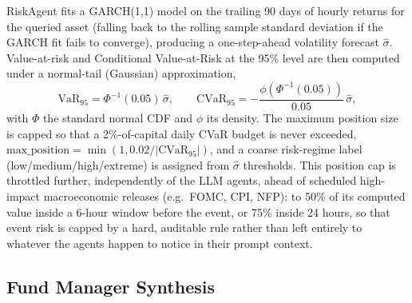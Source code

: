 RiskAgent fits a GARCH(1,1) model \cite{bollerslev1986} on the trailing 90 days of hourly returns for the queried asset (falling back to the rolling sample standard deviation if the GARCH fit fails to converge), producing a one-step-ahead volatility forecast $\hat\sigma$. Value-at-risk and Conditional Value-at-Risk \cite{rockafellar2000} at the 95\% level are then computed under a normal-tail (Gaussian) approximation,
\[
\mathrm{VaR}_{95} = \Phi^{-1}(0.05)\,\hat\sigma, \qquad
\mathrm{CVaR}_{95} = -\frac{\phi(\Phi^{-1}(0.05))}{0.05}\,\hat\sigma,
\]
with $\Phi$ the standard normal CDF and $\phi$ its density. The maximum position size is capped so that a 2\%-of-capital daily CVaR budget is never exceeded, $\mathrm{max\_position} = \min(1, 0.02 / |\mathrm{CVaR}_{95}|)$, and a coarse risk-regime label (low/medium/high/extreme) is assigned from $\hat\sigma$ thresholds. This position cap is throttled further, independently of the LLM agents, ahead of scheduled high-impact macroeconomic releases (e.g.\ FOMC, CPI, NFP): to 50\% of its computed value inside a 6-hour window before the event, or 75\% inside 24 hours, so that event risk is capped by a hard, auditable rule rather than left entirely to whatever the agents happen to notice in their prompt context.

\subsection{Fund Manager Synthesis}
\label{subsec:fund-manager-synthesis}

